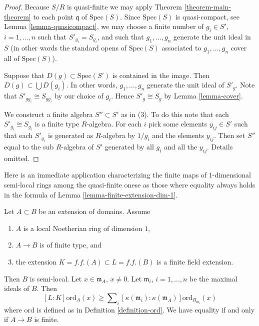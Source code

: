 \begin{proof}
Because $S/R$ is quasi-finite we may apply
Theorem \ref{theorem-main-theorem} to
each point $\mathfrak q$ of $\text{Spec}(S)$.
Since $\text{Spec}(S)$ is quasi-compact, see
Lemma \ref{lemma-quasicompact}, we may choose
a finite number of $g_i \in S'$, $i = 1, \ldots, n$
such that $S'_{g_i} = S_{g_i}$, and such that
$g_1, \ldots, g_n$ generate the unit ideal in $S$
(in other words the standard opens of $\text{Spec}(S)$ associated
to $g_1, \ldots, g_n$ cover all of $\text{Spec}(S)$).

\medskip\noindent
Suppose that $D(g) \subset \text{Spec}(S')$
is contained in the image. Then $D(g) \subset \bigcup D(g_i)$.
In other words, $g_1, \ldots, g_n$ generate the unit ideal of
$S'_g$. Note that $S'_{gg_i} \cong S_{gg_i}$ by our choice
of $g_i$. Hence $S'_g \cong S_g$ by Lemma \ref{lemma-cover}.

\medskip\noindent
We construct a finite algebra $S'' \subset S'$ as
in (3). To do this note that each $S'_{g_i} \cong S_{g_i}$
is a finite type $R$-algebra. For each $i$ pick
some elements $y_{ij} \in S'$ such that each
$S'_{g_i}$ is generated as $R$-algebra by $1/g_i$
and the elements $y_{ij}$. Then set $S''$
equal to the sub $R$-algebra of $S'$ generated by all $g_i$
and all the $y_{ij}$. Details omitted.
\end{proof}

\noindent
Here is an immediate application characterizing the finite
maps of $1$-dimensional semi-local rings among the quasi-finite
onese as those where equality always holds in the
formula of Lemma \ref{lemma-finite-extension-dim-1}.

\begin{lemma}
\label{lemma-quasi-finite-extension-dim-1}
Let $A \subset B$ be an extension of domains. Assume
\begin{enumerate}
\item $A$ is a local Noetherian ring of dimension $1$,
\item $A \to B$ is of finite type, and
\item the extension $K = f.f.(A) \subset L = f.f.(B)$
is a finite field extension.
\end{enumerate}
Then $B$ is semi-local.
Let $x \in \mathfrak m_A$, $x \not = 0$.
Let $\mathfrak m_i$, $i = 1, \ldots, n$
be the maximal ideals of $B$.
Then
$$
[L : K]\text{ord}_A(x)
\geq
\sum\nolimits_i
[\kappa(\mathfrak m_i) : \kappa(\mathfrak m_A)]
\text{ord}_{B_{\mathfrak m_i}}(x)
$$
where $\text{ord}$ is defined as in Definition \ref{definition-ord}.
We have equality if and only if $A \to B$ is finite.
\end{lemma}

